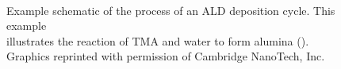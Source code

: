 \begin{figure}[tbp]
{	}  
	\hspace{6pt}	
   \\
	\hspace{6pt} 
   \caption[Illustration of Example ALD Cycle]%
   		{Example schematic of the process of an ALD deposition cycle. This example\\%
		illustrates the reaction of TMA and water to form alumina (). \\%
		{\tiny Graphics reprinted with permission of Cambridge NanoTech, Inc.}\cite{CNT-web}}
   \label{fig:TMA-illustration}
\end{figure}

